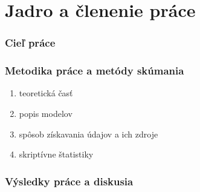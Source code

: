 \chapter{Jadro a členenie práce}

\label{kap:clenenie} %

\subsection{Cieľ práce}


\subsection{Metodika práce a metódy skúmania}

\begin{enumerate}
\item  teoretická časť
\item  popis modelov
\item  spôsob získavania údajov a ich zdroje
\item  skriptívne štatistiky
\end{enumerate}

\subsection{Výsledky práce a diskusia}
 

